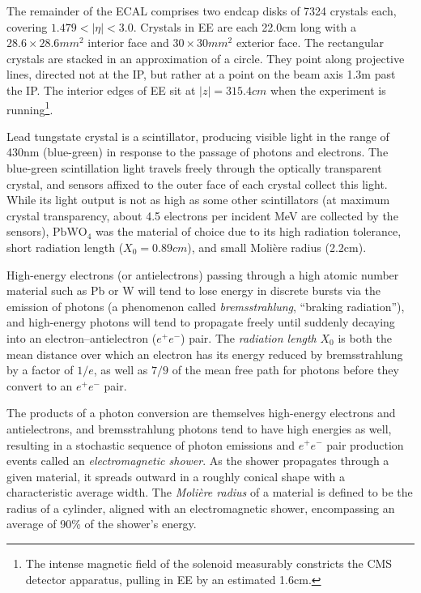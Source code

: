 \documentclass[oneside, letterpaper, 12pt, oldfontcommands]{memoir}
\begin{document}
The remainder of the ECAL comprises two endcap disks of 7324 crystals each, covering $1.479 < |\eta| < 3.0$.
Crystals in EE are each 22.0\unit{cm} long with a $28.6{\times}28.6\unit{mm^2}$ interior face and $30{\times}30\unit{mm^2}$ exterior face.
The rectangular crystals are stacked in an approximation of a circle. They point along projective lines, directed not at the IP, but rather at a point on
the beam axis 1.3\unit{m} past the IP. The interior edges of EE sit at $|z| = 315.4\unit{cm}$ when the experiment is running\footnote{The intense magnetic
field of the solenoid measurably constricts the CMS detector apparatus, pulling in EE by an estimated 1.6\unit{cm}.}.

Lead tungstate crystal is a scintillator, producing visible
light in the range of 430\unit{nm} (blue-green) in response to the passage of photons and electrons. The blue-green scintillation light travels freely through
the optically transparent crystal, and sensors affixed to the outer face of each crystal collect this light. While its light output is not as high as some other
scintillators (at maximum crystal transparency, about 4.5 electrons per incident MeV are collected by the sensors), $\mathrm{PbWO}_{4}$ was the material of choice
due to its high radiation tolerance, short radiation length ($X_{0} = 0.89\unit{cm}$), and small Molière radius (2.2\unit{cm}).

High-energy electrons (or antielectrons) passing through a high atomic number material such as Pb or W will tend to lose energy in discrete
bursts via the emission of photons (a phenomenon called \textit{bremsstrahlung}, ``braking radiation''), and high-energy photons will tend to propagate freely until suddenly decaying into
an electron--antielectron ($e^{+}e^{-}$) pair. The \textit{radiation length} $X_{0}$ is both the mean distance over which an electron has its energy reduced by bremsstrahlung
by a factor of $1/e$, as well as $7/9$ of the mean free path for photons before they convert to an $e^{+}e^{-}$ pair.

The products of a photon conversion are themselves high-energy electrons and antielectrons, and bremsstrahlung photons tend to have high energies as well,
resulting in a stochastic sequence of photon emissions and $e^{+}e^{-}$ pair production events called an \textit{electromagnetic shower}. As the shower
propagates through a given material, it spreads outward in a roughly conical shape with a characteristic average width. The \textit{Molière radius} of a material
is defined to be the radius of a cylinder, aligned with an electromagnetic shower, encompassing an average of 90\% of the shower's energy.
\end{document}
